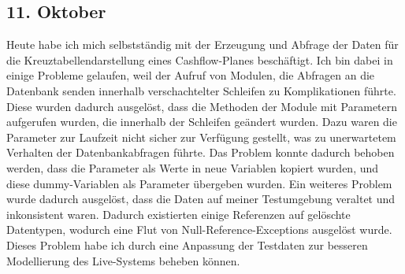 \subsection{11. Oktober}
Heute habe ich mich selbstständig mit der Erzeugung und Abfrage der Daten für die Kreuztabellendarstellung eines Cashflow-Planes beschäftigt. Ich bin dabei in einige Probleme gelaufen, weil der Aufruf von Modulen, die Abfragen an die Datenbank senden innerhalb verschachtelter Schleifen zu Komplikationen führte. Diese wurden dadurch ausgelöst, dass die Methoden der Module mit Parametern aufgerufen wurden, die innerhalb der Schleifen geändert wurden. Dazu waren die Parameter zur Laufzeit nicht sicher zur Verfügung gestellt, was zu unerwartetem Verhalten der Datenbankabfragen führte. Das Problem konnte dadurch behoben werden, dass die Parameter als Werte in neue Variablen kopiert wurden, und diese dummy-Variablen als Parameter übergeben wurden. Ein weiteres Problem wurde dadurch ausgelöst, dass die Daten auf meiner Testumgebung veraltet und inkonsistent waren. Dadurch existierten einige Referenzen auf gelöschte Datentypen, wodurch eine Flut von Null-Reference-Exceptions ausgelöst wurde. Dieses Problem habe ich durch eine Anpassung der Testdaten zur besseren Modellierung des Live-Systems beheben können.
